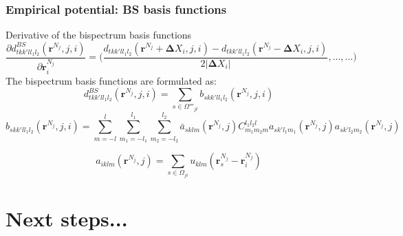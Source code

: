 \documentclass[10pt]{beamer}
\theoremstyle{remark}
\theoremstyle{definition}
\begin{document}
 
 


\begin{frame}
\frametitle{Empirical potential: BS basis functions}
\small

Derivative of the bispectrum basis functions
\begin{equation*}
     \frac{\partial d^{BS}_{tkk'l{l_1}{l_2}}(\bm r^{N_j}, j, i)}{\partial \bm r^{N_j}_i} =  
 \bigg( \frac{ d_{tkk'l{l_1}{l_2}}(\bm r^{N_j} + \bm \Delta X_i, j, i) - d_{tkk'l{l_1}{l_2}}(\bm r^{N_j} - \bm \Delta X_i, j, i) } {2 |\bm \Delta X_i|}, ..., ... \bigg)
\label{eq:bs}
\end{equation*}
\pause
The bispectrum basis functions are formulated as:
\begin{equation*}
    d^{BS}_{tkk'l{l_1}{l_2}}(\bm r^{N_j}, j, i) = \sum_{s \in \Omega'''_{jt}} b_{skk'l{l_1}{l_2}}(\bm r^{N_j}, j, i)
\label{eq:d_bs}
\end{equation*}
\begin{equation*}
    b_{skk'l{l_1}{l_2}}(\bm r^{N_j}, j, i) = 
     \sum_{m=-l}^l
     \sum_{m_1=-{l_1}}^{l_1}
     \sum_{m_2=-l_2}^{l_2}
     \bar{a}_{sklm}(\bm r^{N_j}, j)
     C_{{m_1}{m_2}m}^{{l_1}{l_2}l}
     a_{sk'{l_1}{m_1}}(\bm r^{N_j}, j)
     a_{sk'{l_2}{m_2}}(\bm r^{N_j}, j)
\end{equation*}

\begin{equation*}
    a_{iklm}(\bm r^{N_j}, j) = \sum_{s \in \Omega_{ji}} u_{klm}(\bm r^{N_j}_s -\bm r^{N_j}_i)
\end{equation*}
\end{frame}



\section{Next steps...}
\end{document}
